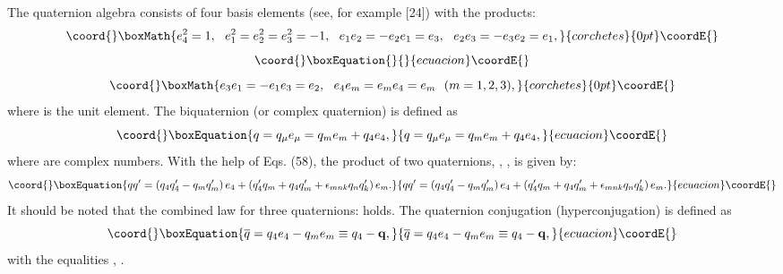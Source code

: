 \documentclass[a4paper,12pt]{article}
\begin{document}
The quaternion algebra consists of four basis elements \coordHE{} (see, for example [24]) with the products:
\[\coord{}\boxMath{
e_4^2=1,~~e_1^2=e_2^2=e_3^2=-1 ,~~e_1e_2=-e_2e_1=e_3
,~~e_2e_3=-e_3e_2=e_1 ,
}{corchetes}{0pt}\coordE{}\]
\vspace{-7mm}
\begin{equation}\coord{}\boxEquation{
\label{58}
}{
}{ecuacion}\coordE{}\end{equation}
\vspace{-7mm}
\[\coord{}\boxMath{
e_3e_1=-e_1e_3=e_2 ,~~ e_4e_m=e_me_4=e_m ~~(m=1, 2, 3) ,
}{corchetes}{0pt}\coordE{}\]
where \coordHE{} is the unit element. The biquaternion (or complex
quaternion) \coordHE{} is defined as
\begin{equation}\coord{}\boxEquation{
q=q_\mu e_\mu =q_me_m+q_4e_4 ,  \label{59}
}{
q=q_\mu e_\mu =q_me_m+q_4e_4 ,  }{ecuacion}\coordE{}\end{equation}
where \coordHE{} are complex numbers. With the help of Eqs. (58),
the product of two quaternions, \coordHE{}, \coordHE{}, is given by:
\begin{equation}\coord{}\boxEquation{
qq^{\prime }=\left( q_4q_4^{\prime }-q_mq_m^{\prime }\right)
e_4+\left( q_4^{\prime }q_m+q_4q_m^{\prime }+\epsilon
_{mnk}q_nq_k^{\prime }\right) e_m . \label{60}
}{
qq^{\prime }=\left( q_4q_4^{\prime }-q_mq_m^{\prime }\right)
e_4+\left( q_4^{\prime }q_m+q_4q_m^{\prime }+\epsilon
_{mnk}q_nq_k^{\prime }\right) e_m . }{ecuacion}\coordE{}\end{equation}
It should be noted that the combined law for three quaternions:
\coordHE{} holds. The
quaternion conjugation (hyperconjugation) is defined as
\begin{equation}\coord{}\boxEquation{
\overline{q}=q_4e_4-q_me_m\equiv q_4-\mathbf{q} ,  \label{61}
}{
\overline{q}=q_4e_4-q_me_m\equiv q_4-\mathbf{q} ,  }{ecuacion}\coordE{}\end{equation}
with the equalities
\coordHE{}, \coordHE{}.
\end{document}
